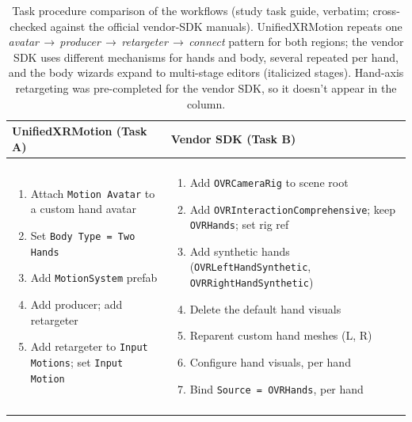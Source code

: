 \documentclass[runningheads]{llncs}
\newenvironment{cellsteps}
  {\begin{enumerate}[leftmargin=*,labelsep=0.4em,labelindent=0pt,
       topsep=0pt,partopsep=0pt,itemsep=1pt,parsep=0pt,label=\arabic*.]}
  {\end{enumerate}}
\begin{document}
\begin{table}[t]
	\caption{Task procedure comparison of the workflows (study task guide,
			verbatim; cross-checked against the official vendor-SDK manuals). 
      UnifiedXRMotion repeats one \emph{avatar\,$\to$\,producer\,$\to$\,retargeter\,$\to$\,connect} pattern for both regions; the vendor SDK uses different mechanisms for hands and body, several repeated per hand, and the body wizards expand to multi-stage
			editors (italicized stages). Hand-axis retargeting was pre-completed for the
			vendor SDK, so it doesn't appear in the column.}
	\label{tab:task-procedure}
	\centering
	\scriptsize
	\setlength{\tabcolsep}{4pt}
	\renewcommand{\arraystretch}{1.1}
	\begin{tabularx}{\textwidth}{@{}>{\raggedright\arraybackslash}X >{\raggedright\arraybackslash}X@{}}
		\toprule
		UnifiedXRMotion (Task A) & Vendor SDK (Task B) \\
		\midrule
		\multicolumn{2}{@{}l}{\textbf{Hands}} \\
		\addlinespace[2pt]
		\begin{cellsteps}
		     \item Attach \texttt{Motion\,Avatar} to a custom hand avatar
		     \item Set \texttt{Body\,Type\,=\,Two\,Hands}
		     \item Add \texttt{MotionSystem} prefab
		     \item Add producer; add retargeter
		     \item Add retargeter to \texttt{Input\,Motions}; set \texttt{Input\,Motion}
		   \end{cellsteps}
		 & \begin{cellsteps}
		     \item Add \texttt{OVRCameraRig} to scene root
		     \item Add \texttt{OVRInteractionComprehensive}; keep \texttt{OVRHands}; set rig ref
		     \item Add synthetic hands (\texttt{OVRLeftHandSynthetic}, \texttt{OVRRightHandSynthetic})
		     \item Delete the default hand visuals
		     \item Reparent custom hand meshes (L, R)
		     \item Configure hand visuals, per hand
		     \item Bind \texttt{Source\,=\,OVRHands}, per hand
		   \end{cellsteps} \\
		\midrule
		\multicolumn{2}{@{}l}{\textbf{Body}} \\

\end{tabularx}
\end{table}
\end{document}
